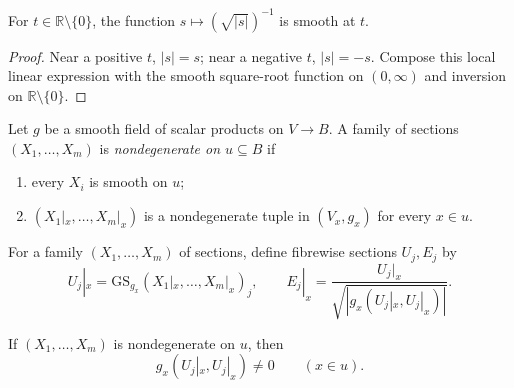 \begin{lemma}
\label{lem:inv-sqrt-abs-smooth}




For $t\in\mathbb R\setminus\{0\}$, the function
$s\mapsto(\sqrt{|s|})^{-1}$ is smooth at $t$.
\end{lemma}

\begin{proof}

\sketch Near a positive $t$, $|s|=s$; near a negative $t$, $|s|=-s$. Compose
this local linear expression with the smooth square-root function on
$(0,\infty)$ and inversion on $\mathbb R\setminus\{0\}$.
\end{proof}

\begin{definition}
\label{def:local-nondegenerate-family}





Let $g$ be a smooth field of scalar products on $V\to B$. A family of sections
$(X_1,\ldots,X_m)$ is \emph{nondegenerate on $u\subseteq B$} if
\begin{enumerate}[label=(\alph*)]
\item every $X_i$ is smooth on $u$;
\item $(X_1|_x,\ldots,X_m|_x)$ is a nondegenerate tuple in $(V_x,g_x)$ for
every $x\in u$.
\end{enumerate}
\end{definition}

\begin{definition}
\label{def:pseudo-gram-schmidt-frame}





For a family $(X_1,\ldots,X_m)$ of sections, define fibrewise sections $U_j,E_j$
by
\[
U_j|_x=\mathrm{GS}_{g_x}(X_1|_x,\ldots,X_m|_x)_j,
\qquad
E_j|_x=\frac{U_j|_x}{\sqrt{|g_x(U_j|_x,U_j|_x)|}}.
\]
\end{definition}

\begin{lemma}
\label{lem:pseudo-gram-schmidt-denominators}





If $(X_1,\ldots,X_m)$ is nondegenerate on $u$, then
\[
g_x(U_j|_x,U_j|_x)\ne0
\qquad(x\in u).
\]
\end{lemma}

